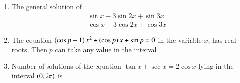 \documentclass[journal,12pt,twocolumn]{IEEEtran}
\theoremstyle{remark}
\begin{document}
\begin{enumerate}
    \item The general solution of 
	\begin{multline*}
		    \sin{x}-3\sin{2x} + \sin{3x} = \\\cos{x}-3\cos{2x} + \cos{3x}
	\end{multline*}
        
        \hfill{}
        \begin{enumerate}
        \end{enumerate}


    \item The equation $\left(\cos{p}-1\right)x^2+\left(\cos{p}\right)x+\sin{p}=0$ in the variable $x$, has real roots. Then $p$ can take any value in the interval
        
        \hfill{}
        \begin{enumerate}

        \end{enumerate}

    \item Number of solutions of the equation $\tan{x}+\sec{x} = 2\cos{x}$ lying in the interval $\left(0, 2\pi\right)$ is
        

\end{enumerate}
\end{document}
